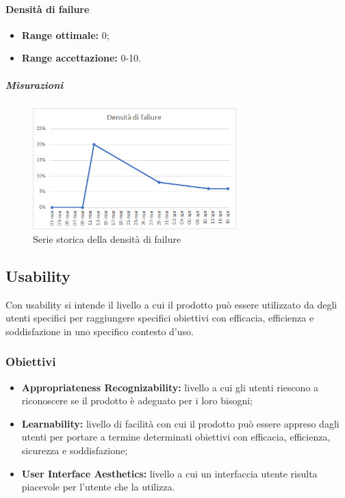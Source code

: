 			\paragraph{Densità di failure} \Spazio
			\begin{itemize}
				\item {\textbf{Range ottimale:} 0;}
				\item {\textbf{Range accettazione:} 0-10.}
			\end{itemize}
		      \subparagraph{Misurazioni}
		     \begin{figure}[H]
		     	\centering 
		     	\includegraphics[width=0.7\textwidth]{Images/fail.png}
		     	\caption{Serie storica della densità di failure}
		     	\label{fail} 
		     \end{figure} 
			
	\subsection{Usability}
		Con usability si intende il livello a cui il prodotto può essere utilizzato da degli utenti specifici per raggiungere specifici obiettivi con efficacia, efficienza e soddisfazione in uno specifico contesto d'uso.  
		\subsubsection{Obiettivi}
		\begin{itemize}
			\item {\textbf{Appropriateness Recognizability:} livello a cui gli utenti riescono a riconoscere se il prodotto è adeguato per i loro bisogni;}
			\item {\textbf{Learnability:} livello di facilità con cui il prodotto può essere appreso dagli utenti per portare a termine determinati obiettivi con efficacia, efficienza, sicurezza e soddisfazione;} 
			\item {\textbf{User Interface Aesthetics:} livello a cui un interfaccia utente risulta piacevole per l'utente che la utilizza. }
			
		\end{itemize}
